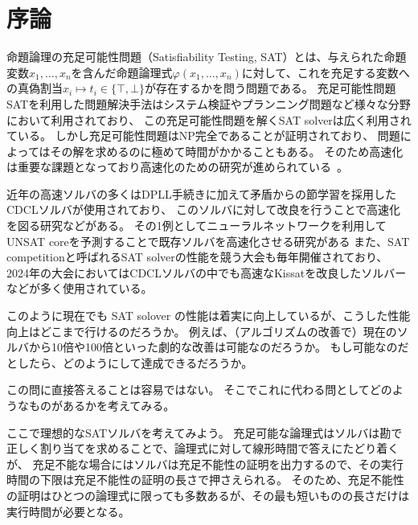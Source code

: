 \section{序論}
命題論理の充足可能性問題（Satisfiability Testing, SAT）とは、与えられた命題変数\( x_1,\dots,x_n \)を含んだ命題論理式\( \varphi(x_1,\dots,x_n) \)に対して、これを充足する変数への真偽割当\( x_i \mapsto t_i \in \{ \top, \bot \} \)が存在するかを問う問題である。
充足可能性問題SATを利用した問題解決手法はシステム検証やプランニング問題など様々な分野において利用されており、
この充足可能性問題を解くSAT solverは広く利用されている\cite{PracticalExample}。
しかし充足可能性問題はNP完全であることが証明されており\cite{Cook}、
問題によってはその解を求めるのに極めて時間がかかることもある。
そのため高速化は重要な課題となっており高速化のための研究が進められている~\cite{glucose,Chaff,BerkMin,MINISAT,kissat,neuralnet-vs-random-VSIDS}。

近年の高速ソルバの多くはDPLL手続き\cite{DPLL}に加えて矛盾からの節学習を採用したCDCLソルバ\cite{CDCL}が使用されており、
このソルバに対して改良を行うことで高速化を図る研究などがある。
その1例としてニューラルネットワークを利用してUNSAT coreを予測することで既存ソルバを高速化させる研究がある\cite{neuralnet-vs-random-VSIDS}
また、SAT competitionと呼ばれるSAT solverの性能を競う大会も毎年開催されており、
2024年の大会においてはCDCLソルバの中でも高速なKissat\cite{kissat}を改良したソルバーなどが多く使用されている。%

このように現在でも SAT solover の性能は着実に向上しているが、こうした性能向上はどこまで行けるのだろうか。
例えば、（アルゴリズムの改善で）現在のソルバから10倍や100倍といった劇的な改善は可能なのだろうか。
もし可能なのだとしたら、どのようにして達成できるだろうか。



この問に直接答えることは容易ではない。
そこでこれに代わる問としてどのようなものがあるかを考えてみる。

ここで理想的なSATソルバを考えてみよう。
充足可能な論理式はソルバは勘で正しく割り当てを求めることで、論理式に対して線形時間で答えにたどり着くが、
充足不能な場合にはソルバは充足不能性の証明を出力するので、その実行時間の下限は充足不能性の証明の長さで押さえられる。
そのため、充足不能性の証明はひとつの論理式に限っても多数あるが、その最も短いものの長さだけは実行時間が必要となる。

